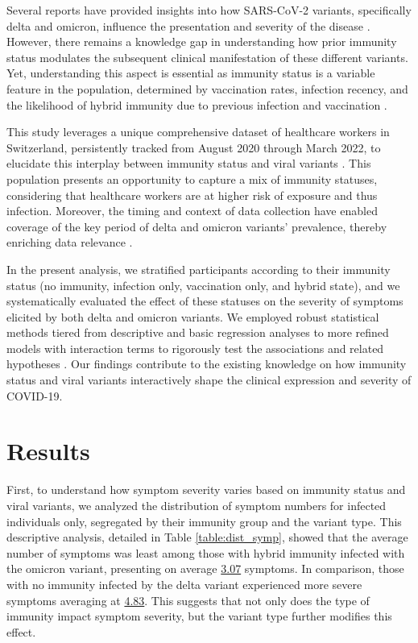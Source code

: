 \documentclass[11pt]{article}
\begin{document}
Several reports have provided insights into how SARS-CoV-2 variants, specifically delta and omicron, influence the presentation and severity of the disease \cite{Whitaker2022VariantspecificSO, Quintero2022DifferencesIS, Florensa2022SeverityOC}. However, there remains a knowledge gap in understanding how prior immunity status modulates the subsequent clinical manifestation of these different variants. Yet, understanding this aspect is essential as immunity status is a variable feature in the population, determined by vaccination rates, infection recency, and the likelihood of hybrid immunity due to previous infection and vaccination \cite{Kim2020SARSCoV2SpecificAA, Chen2020DiseaseSD}. 

This study leverages a unique comprehensive dataset of healthcare workers in Switzerland, persistently tracked from August 2020 through March 2022, to elucidate this interplay between immunity status and viral variants \cite{Baskin2021HealthcareWR, Hall2021EffectivenessOB}. This population presents an opportunity to capture a mix of immunity statuses, considering that healthcare workers are at higher risk of exposure and thus infection. Moreover, the timing and context of data collection have enabled coverage of the key period of delta and omicron variants' prevalence, thereby enriching data relevance \cite{Brehm2021SARSCoV2RI, Shreffler2020TheIO}. 

In the present analysis, we stratified participants according to their immunity status (no immunity, infection only, vaccination only, and hybrid state), and we systematically evaluated the effect of these statuses on the severity of symptoms elicited by both delta and omicron variants. We employed robust statistical methods tiered from descriptive and basic regression analyses to more refined models with interaction terms to rigorously test the associations and related hypotheses \cite{Harrison2020ComorbiditiesAW, Mesas2020PredictorsOI, Corpechot2014BaselineVA}. Our findings contribute to the existing knowledge on how immunity status and viral variants interactively shape the clinical expression and severity of COVID-19.

\section*{Results}

First, to understand how symptom severity varies based on immunity status and viral variants, we analyzed the distribution of symptom numbers for infected individuals only, segregated by their immunity group and the variant type. This descriptive analysis, detailed in Table \ref{table:dist_symp}, showed that the average number of symptoms was least among those with hybrid immunity infected with the omicron variant, presenting on average \hyperlink{A1a}{3.07} symptoms. In comparison, those with no immunity infected by the delta variant experienced more severe symptoms averaging at \hyperlink{A4a}{4.83}. This suggests that not only does the type of immunity impact symptom severity, but the variant type further modifies this effect.
\end{document}
